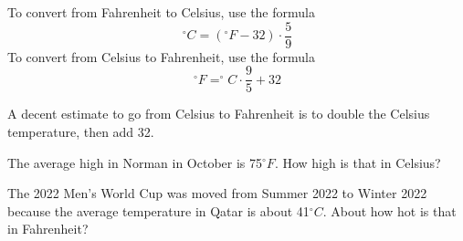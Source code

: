 \documentclass[notes]{subfiles}
\begin{document}
		\begin{rmk}
			To convert from Fahrenheit to Celsius, use the formula%
			\[^\circ C = (^\circ F-32)\cdot \dfrac{5}{9}\]
			To convert from Celsius to Fahrenheit, use the formula%
			\[^\circ F = ^\circ C\cdot \dfrac{9}{5} + 32\]
			
			A decent estimate to go from Celsius to Fahrenheit is to double the Celsius temperature, then add 32.%
		\end{rmk}
		
		\begin{ex}
			The average high in Norman in October is 75\(^\circ F\).  How high is that in Celsius?%
		\end{ex}
			
		\begin{ex}
			The 2022 Men's World Cup was moved from Summer 2022 to Winter 2022 because the average temperature in Qatar is about 41\(^\circ C\).  About how hot is that in Fahrenheit?%
		\end{ex}
\clearpage
\end{document}
